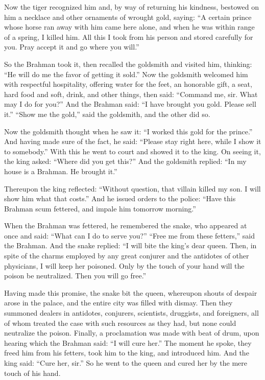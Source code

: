 \documentclass[article, twoside, 14pt]{memoir}
\begin{document}
Now the tiger recognized him and, by way of returning his kindness,
bestowed on him a necklace and other ornaments of wrought gold,
saying:
``A certain prince whose horse ran away with him came here alone, and when he was within range of a spring, I killed him. All this I took from his person and stored carefully for you. Pray accept it and go where you will.''

So the Brahman took it, then recalled the goldsmith and visited
him, thinking: ``He will do me the favor of getting it sold.'' Now
the goldsmith welcomed him with respectful hospitality, offering
water for the feet, an honorable gift, a seat, hard food and soft,
drink, and other things, then said:
``Command me, sir. What may I do for you?'' And the Brahman said:
``I have brought you gold. Please sell it.'' ``Show me the gold,''
said the goldsmith, and the other did so.

Now the goldsmith thought when he saw it:
``I worked this gold for the prince.'' And having made sure of the
fact, he said:
``Please stay right here, while I show it to somebody.'' With this
he went to court and showed it to the king. On seeing it, the king
asked: ``Where did you get this?'' And the goldsmith replied:
``In my house is a Brahman. He brought it.''

Thereupon the king reflected:
``Without question, that villain killed my son. I will show him what that costs.''
And he issued orders to the police:
``Have this Brahman scum fettered, and impale him tomorrow morning.''

When the Brahman was fettered, he remembered the snake, who
appeared at once and said: ``What can I do to serve you?''
``Free me from these fetters,'' said the Brahman. And the snake
replied:
``I will bite the king's dear queen. Then, in spite of the charms employed by any great conjurer and the antidotes of other physicians, I will keep her poisoned. Only by the touch of your hand will the poison be neutralized. Then you will go free.''

Having made this promise, the snake bit the queen, whereupon shouts
of despair arose in the palace, and the entire city was filled with
dismay. Then they summoned dealers in antidotes, conjurers,
scientists, druggists, and foreigners, all of whom treated the case
with such resources as they had, but none could neutralize the
poison. Finally, a proclamation was made with beat of drum, upon
hearing which the Brahman said: ``I will cure her.'' The moment he
spoke, they freed him from his fetters, took him to the king, and
introduced him. And the king said: ``Cure her, sir.'' So he went to
the queen and cured her by the mere touch of his hand.
\end{document}
